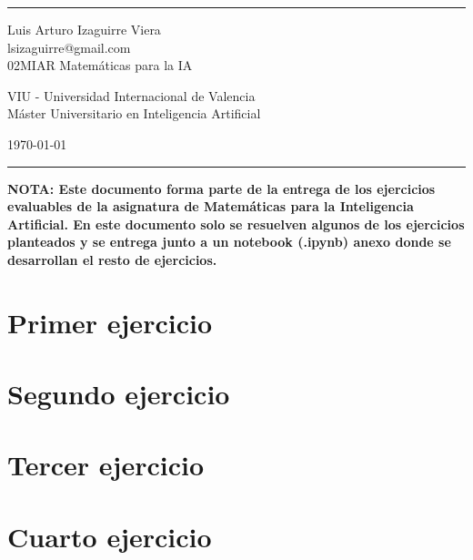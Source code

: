 \documentclass[a4paper]{article}
\begin{document}

\fancyhead[C]{}
\hrule \medskip %
\begin{minipage}{0.245\textwidth} 
\raggedright
\footnotesize
Luis Arturo Izaguirre Viera \hfill\\   
lsizaguirre@gmail.com \hfill\\   
02MIAR Matemáticas para la IA\\ 
\end{minipage}
\begin{minipage}{0.5\textwidth} 
\centering 
VIU - Universidad Internacional de Valencia\\ 
Máster Universitario en Inteligencia Artificial\\
\end{minipage}
\begin{minipage}{0.245\textwidth} 
\raggedleft
\today\hfill\\
\end{minipage}
\medskip\hrule
\bigskip
\textbf{\scriptsize {NOTA: Este documento forma parte de la entrega de los ejercicios evaluables de la asignatura de Matemáticas para la Inteligencia Artificial. En este documento solo se resuelven algunos de los ejercicios planteados y se entrega junto a un notebook (.ipynb) anexo donde se desarrollan el resto de ejercicios.}}
\bigskip


\section{Primer ejercicio}




\section{Segundo ejercicio}




\section{Tercer ejercicio}




\section{Cuarto ejercicio}



\end{document}
